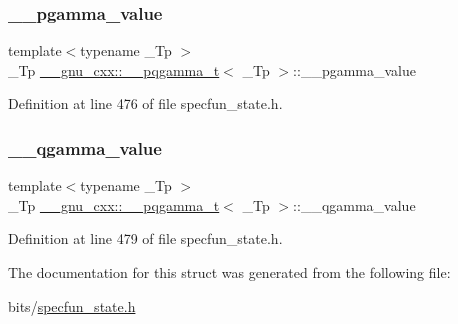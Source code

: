\subsubsection{\texorpdfstring{\+\_\+\+\_\+pgamma\+\_\+value}{\_\_pgamma\_value}}
{\footnotesize\ttfamily template$<$typename \+\_\+\+Tp $>$ \\
\+\_\+\+Tp \hyperlink{struct____gnu__cxx_1_1____pqgamma__t}{\+\_\+\+\_\+gnu\+\_\+cxx\+::\+\_\+\+\_\+pqgamma\+\_\+t}$<$ \+\_\+\+Tp $>$\+::\+\_\+\+\_\+pgamma\+\_\+value}



Definition at line 476 of file specfun\+\_\+state.\+h.

\mbox{\label{struct____gnu__cxx_1_1____pqgamma__t_ab053b01578e22ba923ca2a4007b1f0a7}} 
\subsubsection{\texorpdfstring{\+\_\+\+\_\+qgamma\+\_\+value}{\_\_qgamma\_value}}
{\footnotesize\ttfamily template$<$typename \+\_\+\+Tp $>$ \\
\+\_\+\+Tp \hyperlink{struct____gnu__cxx_1_1____pqgamma__t}{\+\_\+\+\_\+gnu\+\_\+cxx\+::\+\_\+\+\_\+pqgamma\+\_\+t}$<$ \+\_\+\+Tp $>$\+::\+\_\+\+\_\+qgamma\+\_\+value}



Definition at line 479 of file specfun\+\_\+state.\+h.



The documentation for this struct was generated from the following file\+:\begin{DoxyCompactItemize}
\item 
bits/\hyperlink{specfun__state_8h}{specfun\+\_\+state.\+h}\end{DoxyCompactItemize}
